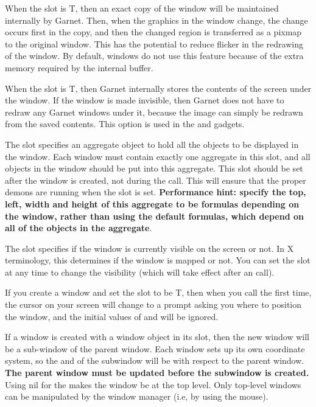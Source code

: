 When the  slot is T, then an exact copy of the window
will be maintained internally by Garnet.  Then, when the graphics in the window
change, the change occurs first in the copy, and then the changed region is
transferred as a pixmap to the original window.  This has the potential to
reduce flicker in the redrawing of the window.  By default, windows do not use
this feature because of the extra memory required by the internal buffer.

When the  slot is T, then Garnet internally stores the
contents of the screen under the window.  If the window is made invisible,
then Garnet does not have to redraw any Garnet windows under it, because the
image can simply be redrawn from the saved contents.  This option is used in
the  and  gadgets.

The  slot specifies an aggregate object to hold all the
objects to be displayed in the
window.  Each window must contain exactly one aggregate in this slot, and
all objects in the window should be put into this aggregate.  This
slot should be set after the window is created, not during the
 call.  This will ensure that the proper demons
are running when the slot is set.
{\bf Performance hint: specify the top, left, width and height of this
aggregate to be formulas depending on the window, rather than using the
default formulas, which depend on all of the objects in the aggregate}.

The  slot specifies if the window is currently visible on the
screen or not.  In X terminology, this
determines if the window is mapped or not.  You can set the 
slot at any time to change the visibility (which will take effect after an
 call).

If you create a window and set the  slot to be
T, then when you call  the first time, the cursor on your
screen will change to a
prompt asking you where to position the window, and the initial values of
 and  will be ignored.

If a window is created with a window object in its  slot, then
the new window will be a sub-window of the parent window.
Each window sets up its own coordinate system, so the  and
 of the subwindow will be with respect to the parent window.
{\bf The parent window must be updated before the subwindow is created.}
Using {\sc nil} for the  makes the window be at the top level.  Only
top-level windows can be manipulated by the window manager (i.e, by using
the mouse).



